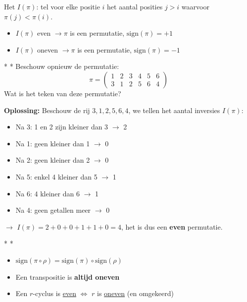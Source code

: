 
Het  $I(\pi)$: tel voor elke positie $i$ het aantal posities $j > i$ waarvoor $\pi(j) < \pi(i)$.
\begin{itemize}
    \item $I(\pi)$ even $\rightarrow \pi$ is een  permutatie, $\text{sign}(\pi) = +1$
    \item $I(\pi)$ oneven $\rightarrow \pi$ is een  permutatie, $\text{sign}(\pi) = -1$
\end{itemize}

\begin{niceexample}*
    \nextpart[Voorbeeld:]*
    Beschouw opnieuw de permutatie:
    \begin{equation*}
        \pi = \begin{pmatrix}
            1 & 2 & 3 & 4 & 5 & 6 \\
            3 & 1 & 2 & 5 & 6 & 4
        \end{pmatrix}
    \end{equation*}
    Wat is het teken van deze permutatie?

    \vspace{0.5cm}

    \textbf{Oplossing:} Beschouw de rij $3, 1, 2, 5, 6, 4$, we tellen het aantal inversies $I(\pi)$:
    \begin{itemize}
        \item Na 3: 1 en 2 zijn kleiner dan 3 $\rightarrow$ 2
        \item Na 1: geen kleiner dan 1 $\rightarrow$ 0
        \item Na 2: geen kleiner dan 2 $\rightarrow$ 0
        \item Na 5: enkel 4 kleiner dan 5 $\rightarrow$ 1
        \item Na 6: 4 kleiner dan 6 $\rightarrow$ 1
        \item Na 4: geen getallen meer $\rightarrow$ 0
    \end{itemize}
    $\longrightarrow$ $I(\pi) = 2 + 0 + 0 + 1 + 1 + 0 = 4$, het is dus een \textbf{even} permutatie. 
\end{niceexample}


\begin{nicetheorem}*
    \nextpart[Rekenregels:]*
    \begin{itemize}
        \item $\text{sign}(\pi \circ \rho) = \text{sign}(\pi) \circ \text{sign}(\rho)$
        \item Een transpositie is \textbf{altijd oneven}
        \item Een $r$-cyclus is \underline{even} $\Leftrightarrow$ $r$ is \underline{oneven} (en omgekeerd)
    \end{itemize}
\end{nicetheorem}

